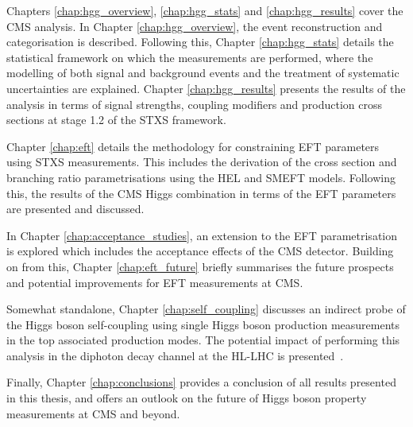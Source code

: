 Chapters {\color{blue}\ref{chap:hgg_overview}}, {\color{blue}\ref{chap:hgg_stats}} and {\color{blue}\ref{chap:hgg_results}} cover the CMS \Hgg analysis. In Chapter {\color{blue}\ref{chap:hgg_overview}}, the event reconstruction and categorisation is described. Following this, Chapter {\color{blue}\ref{chap:hgg_stats}} details the statistical framework on which the measurements are performed, where the modelling of both signal and background events and the treatment of systematic uncertainties are explained. Chapter {\color{blue}\ref{chap:hgg_results}} presents the results of the analysis in terms of signal strengths, coupling modifiers and production cross sections at stage 1.2 of the STXS framework.

Chapter {\color{blue}\ref{chap:eft}} details the methodology for constraining EFT parameters using STXS measurements. This includes the derivation of the cross section and branching ratio parametrisations using the HEL and SMEFT models. Following this, the results of the CMS Higgs combination in terms of the EFT parameters are presented and discussed.

In Chapter {\color{blue}\ref{chap:acceptance_studies}}, an extension to the EFT parametrisation is explored which includes the acceptance effects of the CMS detector. Building on from this, Chapter {\color{blue}\ref{chap:eft_future}} briefly summarises the future prospects and potential improvements for EFT measurements at CMS.

Somewhat standalone, Chapter {\color{blue}\ref{chap:self_coupling}} discusses an indirect probe of the Higgs boson self-coupling using single Higgs boson production measurements in the top associated production modes. The potential impact of performing this analysis in the diphoton decay channel at the HL-LHC is presented~\cite{Cepeda:2019klc,CMS-PAS-FTR-18-020}.

Finally, Chapter {\color{blue}\ref{chap:conclusions}} provides a conclusion of all results presented in this thesis, and offers an outlook on the future of Higgs boson property measurements at CMS and beyond.
